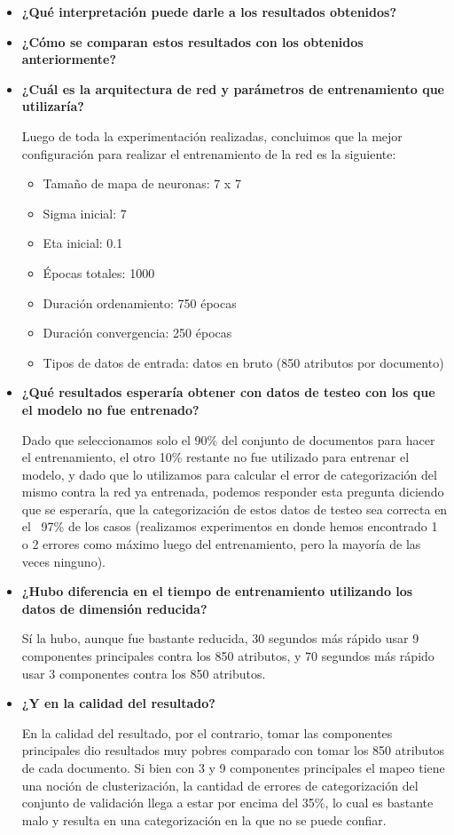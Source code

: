\begin{itemize}

\item \textbf{¿Qué interpretación puede darle a los resultados obtenidos?} 

\item \textbf{¿Cómo se comparan estos resultados con los obtenidos anteriormente?}

\item \textbf{¿Cuál es la arquitectura de red y parámetros de entrenamiento que utilizaría?}

Luego de toda la experimentación realizadas, concluimos que la mejor configuración para realizar el entrenamiento de 
la red es la siguiente:

\begin{itemize}
\item Tamaño de mapa de neuronas: 7 x 7
\item Sigma inicial: 7
\item Eta inicial: 0.1
\item Épocas totales: 1000
\item Duración ordenamiento: 750 épocas
\item Duración convergencia: 250 épocas
\item Tipos de datos de entrada: datos en bruto (850 atributos por documento)
\end{itemize}

\item \textbf{¿Qué resultados esperaría obtener con datos de testeo con los que el modelo no fue entrenado?}

Dado que seleccionamos solo el 90\% del conjunto de documentos para hacer el entrenamiento, el otro 10\% restante no fue utilizado 
para entrenar el modelo, y dado que lo utilizamos para calcular el error de categorización del mismo contra la red ya entrenada, 
podemos responder esta pregunta diciendo que se esperaría, que la categorización de estos datos de testeo sea correcta en el 
~97\% de los casos (realizamos experimentos en donde hemos encontrado 1 o 2 errores como máximo luego del entrenamiento, pero la 
mayoría de las veces ninguno).

\item \textbf{¿Hubo diferencia en el tiempo de entrenamiento utilizando los datos de dimensión reducida?}

Sí la hubo, aunque fue bastante reducida, 30 segundos más rápido usar 9 componentes principales contra los 850 atributos, y 70 segundos 
más rápido usar 3 componentes contra los 850 atributos. 

\item \textbf{¿Y en la calidad del resultado?}

En la calidad del resultado, por el contrario, tomar las componentes principales dio resultados muy pobres comparado con 
tomar los 850 atributos de cada documento. Si bien con 3 y 9 componentes principales el mapeo tiene una noción de clusterización,
la cantidad de errores de categorización del conjunto de validación llega a estar por encima del 35\%, lo cual es bastante malo y
resulta en una categorización en la que no se puede confiar. 

\end{itemize}

